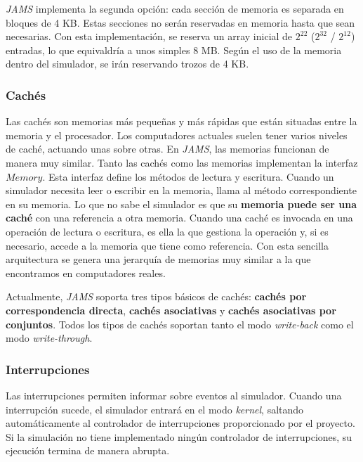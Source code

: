 \textit{JAMS} implementa la segunda opción:
cada sección de memoria es separada en bloques de 4 KB.
Estas secciones no serán reservadas en memoria
hasta que sean necesarias.
Con esta implementación, se reserva un array inicial de
$2^{22}$ ($2^{32}$ / $2^{12}$) entradas, lo que equivaldría
a unos simples 8 MB\@.
Según el uso de la memoria dentro del simulador,
se irán reservando trozos de 4 KB\@.

\subsubsection{Cachés}\label{subsubsec:caches}

Las cachés son memorias más pequeñas y más rápidas que están
situadas entre la memoria y el procesador.
Los computadores actuales suelen tener varios niveles de caché,
actuando unas sobre otras.
En \textit{JAMS}, las memorias funcionan de manera muy similar.
Tanto las cachés como las memorias implementan la interfaz $Memory$.
Esta interfaz define los métodos de lectura y escritura.
Cuando un simulador necesita leer o escribir en la memoria,
llama al método correspondiente en su memoria.
Lo que no sabe el simulador es que su \textbf{memoria puede ser una caché}
con una referencia a otra memoria.
Cuando una caché es invocada en una operación de lectura o escritura,
es ella la que gestiona la operación y,
si es necesario, accede a la memoria que tiene como referencia.
Con esta sencilla arquitectura se genera una jerarquía de memorias
muy similar a la que encontramos en computadores reales.

Actualmente, \textit{JAMS} soporta tres tipos básicos
de cachés: \textbf{cachés por correspondencia directa},
\textbf{cachés asociativas} y \textbf{cachés asociativas por conjuntos}.
Todos los tipos de cachés soportan tanto el modo \textit{write-back}
como el modo \textit{write-through}.

\subsubsection{Interrupciones}\label{subsubsec:interrupciones}

Las interrupciones permiten informar sobre eventos al
simulador.
Cuando una interrupción sucede, el simulador entrará en el
modo \textit{kernel}, saltando automáticamente al controlador
de interrupciones proporcionado por el proyecto.
Si la simulación no tiene implementado ningún controlador de
interrupciones, su ejecución termina de manera abrupta.

